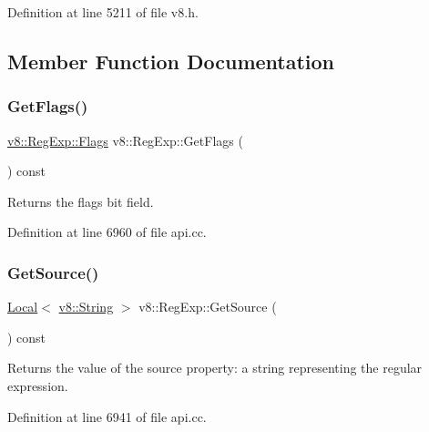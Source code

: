 Definition at line 5211 of file v8.\+h.



\subsection{Member Function Documentation}
\mbox{\label{classv8_1_1RegExp_a1f3357d22f9f403ee7bdad393b740b7a}} 
\subsubsection{\texorpdfstring{Get\+Flags()}{GetFlags()}}
{\footnotesize\ttfamily \mbox{\hyperlink{classv8_1_1RegExp_aa4718a5c1f18472aff3bf51ed694fc5a}{v8\+::\+Reg\+Exp\+::\+Flags}} v8\+::\+Reg\+Exp\+::\+Get\+Flags (\begin{DoxyParamCaption}{ }\end{DoxyParamCaption}) const}

Returns the flags bit field. 

Definition at line 6960 of file api.\+cc.

\mbox{\label{classv8_1_1RegExp_a21bc6ac9419240fb1a774365c28cea08}} 
\subsubsection{\texorpdfstring{Get\+Source()}{GetSource()}}
{\footnotesize\ttfamily \mbox{\hyperlink{classv8_1_1Local}{Local}}$<$ \mbox{\hyperlink{classv8_1_1String}{v8\+::\+String}} $>$ v8\+::\+Reg\+Exp\+::\+Get\+Source (\begin{DoxyParamCaption}{ }\end{DoxyParamCaption}) const}

Returns the value of the source property\+: a string representing the regular expression. 

Definition at line 6941 of file api.\+cc.

\mbox{\label{classv8_1_1RegExp_a70ef0ef612099975b84304236736135e}} 

